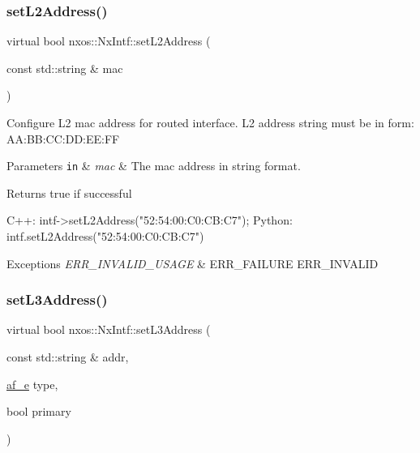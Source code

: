 \subsubsection{\texorpdfstring{set\+L2\+Address()}{setL2Address()}}
{\footnotesize\ttfamily virtual bool nxos\+::\+Nx\+Intf\+::set\+L2\+Address (\begin{DoxyParamCaption}\item[{const std\+::string \&}]{mac }\end{DoxyParamCaption})\hspace{0.3cm}{\ttfamily [pure virtual]}}

Configure L2 mac address for routed interface. L2 address string must be in form\+: A\+A\+:\+B\+B\+:\+C\+C\+:\+D\+D\+:\+EE\+:FF 
\begin{DoxyParams}[1]{Parameters}
\mbox{\tt in}  & {\em mac} & The mac address in string format. \\
\hline
\end{DoxyParams}
\begin{DoxyReturn}{Returns}
true if successful
\end{DoxyReturn}

\begin{DoxyCode}
C++:
      intf->setL2Address(\textcolor{stringliteral}{"52:54:00:C0:CB:C7"});
Python:
      intf.setL2Address(\textcolor{stringliteral}{"52:54:00:C0:CB:C7"})
\end{DoxyCode}



\begin{DoxyExceptions}{Exceptions}
{\em E\+R\+R\+\_\+\+I\+N\+V\+A\+L\+I\+D\+\_\+\+U\+S\+A\+GE} & E\+R\+R\+\_\+\+F\+A\+I\+L\+U\+RE E\+R\+R\+\_\+\+I\+N\+V\+A\+L\+ID \\
\hline
\end{DoxyExceptions}
\mbox{\label{classnxos_1_1_nx_intf_a9ff78e595e9d16ab1eca675daa98c34e}} 
\subsubsection{\texorpdfstring{set\+L3\+Address()}{setL3Address()}}
{\footnotesize\ttfamily virtual bool nxos\+::\+Nx\+Intf\+::set\+L3\+Address (\begin{DoxyParamCaption}\item[{const std\+::string \&}]{addr,  }\item[{\mbox{\hyperlink{namespacenxos_a3a667f48b94db10aa398940dc5bf72d7}{af\+\_\+e}}}]{type,  }\item[{bool}]{primary }\end{DoxyParamCaption})\hspace{0.3cm}{\ttfamily [pure virtual]}}

